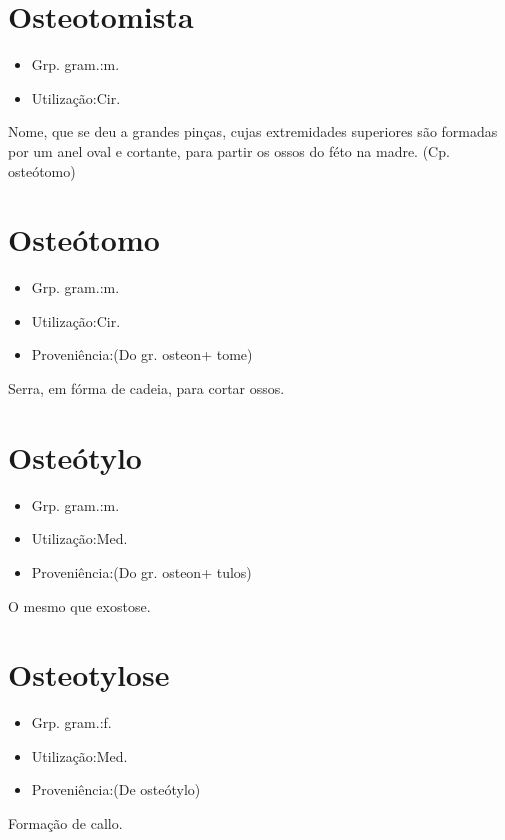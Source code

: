 \section{Osteotomista}
\begin{itemize}
\item {Grp. gram.:m.}
\end{itemize}
\begin{itemize}
\item {Utilização:Cir.}
\end{itemize}
Nome, que se deu a grandes pinças, cujas extremidades superiores são formadas por um anel oval e cortante, para partir os ossos do féto na madre.
(Cp. \textunderscore osteótomo\textunderscore )
\section{Osteótomo}
\begin{itemize}
\item {Grp. gram.:m.}
\end{itemize}
\begin{itemize}
\item {Utilização:Cir.}
\end{itemize}
\begin{itemize}
\item {Proveniência:(Do gr. \textunderscore osteon\textunderscore  + \textunderscore tome\textunderscore )}
\end{itemize}
Serra, em fórma de cadeia, para cortar ossos.
\section{Osteótylo}
\begin{itemize}
\item {Grp. gram.:m.}
\end{itemize}
\begin{itemize}
\item {Utilização:Med.}
\end{itemize}
\begin{itemize}
\item {Proveniência:(Do gr. \textunderscore osteon\textunderscore  + \textunderscore tulos\textunderscore )}
\end{itemize}
O mesmo que \textunderscore exostose\textunderscore .
\section{Osteotylose}
\begin{itemize}
\item {Grp. gram.:f.}
\end{itemize}
\begin{itemize}
\item {Utilização:Med.}
\end{itemize}
\begin{itemize}
\item {Proveniência:(De \textunderscore osteótylo\textunderscore )}
\end{itemize}
Formação de callo.
